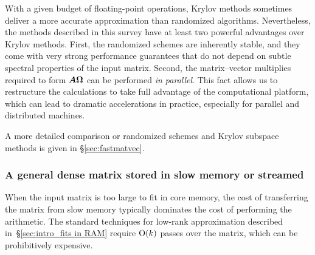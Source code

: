 \documentclass[final]{siamltex}
\newcounter{algorithm}[section]
\begin{document}
With a given budget of floating-point operations, Krylov methods
sometimes deliver a more accurate approximation than randomized
algorithms.  Nevertheless, the methods described in this survey have at least
two powerful advantages over Krylov methods.  First, the randomized schemes
are inherently stable, and they come with very strong performance guarantees
that do not depend on %
subtle spectral properties of the input matrix.  Second, the matrix--vector multiplies
required to form $\bm{A\Omega}$ can be performed \emph{in parallel}.  This
fact allows us to restructure the calculations to take full advantage of the
computational platform, which can lead to dramatic accelerations in practice,
especially for parallel and distributed machines.


A more detailed comparison or randomized schemes and Krylov subspace methods
is given in \S\ref{sec:fastmatvec}.

\subsubsection{A general dense matrix stored in slow memory or streamed}

When the input matrix is too large to fit in core memory, the cost of
transferring the matrix from slow memory typically dominates the cost
of performing the arithmetic.  The standard techniques for low-rank
approximation described in~\S\ref{sec:intro_fits in RAM} require
$\mathrm{O}(k)$ passes over the matrix, which can be prohibitively expensive.
\end{document}
